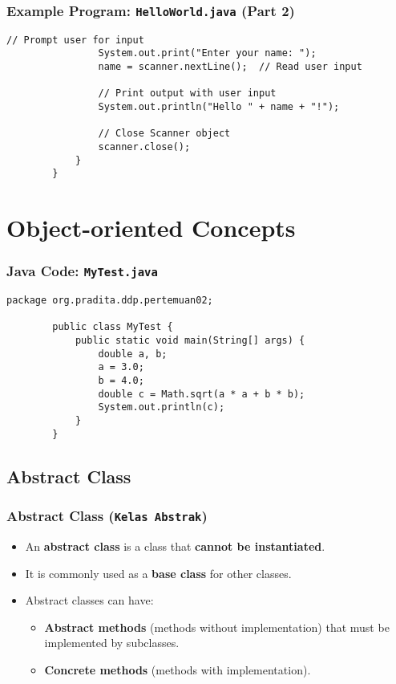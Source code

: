 \documentclass[aspectratio=169, table]{beamer}
\begin{document}
		\begin{frame}[fragile]
			\frametitle{Example Program: \texttt{HelloWorld.java} (Part 2)}
			
			\begin{lstlisting}[style=JavaStyle, caption={Example Program: HelloWorld.java (Part 2)}]
				// Prompt user for input
				System.out.print("Enter your name: ");
				name = scanner.nextLine();  // Read user input
				
				// Print output with user input
				System.out.println("Hello " + name + "!");
				
				// Close Scanner object
				scanner.close();
			}
		}
	\end{lstlisting}
\end{frame}

\section{Object-oriented Concepts}

\begin{frame}[fragile]
	\frametitle{Java Code: \texttt{MyTest.java}}
	\begin{lstlisting}[style=JavaStyle, caption={Java Code: MyTest.java}]
		package org.pradita.ddp.pertemuan02;
		
		public class MyTest {
			public static void main(String[] args) {
				double a, b;
				a = 3.0;
				b = 4.0;
				double c = Math.sqrt(a * a + b * b);
				System.out.println(c);
			}
		}
	\end{lstlisting}
\end{frame}

\subsection{Abstract Class}
\begin{frame}[fragile]
	\frametitle{Abstract Class (\texttt{Kelas Abstrak})}
	
	\begin{itemize}
		\item An \textbf{abstract class} is a class that \textbf{cannot be instantiated}.
		\item It is commonly used as a \textbf{base class} for other classes.
		\item Abstract classes can have:
		\begin{itemize}
			\item \textbf{Abstract methods} (methods without implementation) that must be implemented by subclasses.
			\item \textbf{Concrete methods} (methods with implementation).
		\end{itemize}
	\end{itemize}
\end{frame}
\end{document}
